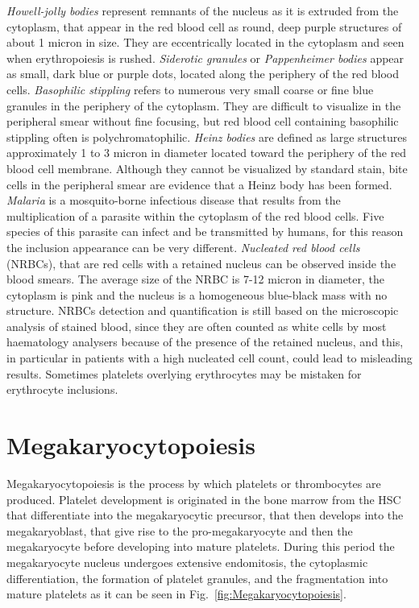 \documentclass[final,a4paper,12pt,english]{UnicaPhdThesis3}
\begin{document}
\textit{Howell-jolly bodies} represent remnants of the nucleus as it is extruded from the cytoplasm, that appear in the red blood cell as round, deep purple structures of about 1 micron in size. They are eccentrically located in the cytoplasm and seen when erythropoiesis is rushed. \textit{Siderotic granules} or \textit{Pappenheimer bodies} appear as small, dark blue or purple dots, located along the periphery of the red blood cells. \textit{Basophilic stippling} refers to numerous very small coarse or fine blue granules in the periphery of the cytoplasm. They are difficult to visualize in the peripheral smear without fine focusing, but red blood cell containing basophilic stippling often is polychromatophilic. \textit{Heinz bodies} are defined as large structures approximately 1 to 3 micron in diameter located toward the periphery of the red blood cell membrane. Although they cannot be visualized by standard stain, bite cells in the peripheral smear are evidence that a Heinz body has been formed. \textit{Malaria} is a mosquito-borne infectious disease that results from the multiplication of a parasite within the cytoplasm of the red blood cells. Five species of this parasite can infect and be transmitted by humans, for this reason the inclusion appearance can be very different. \textit{Nucleated red blood cells} (NRBCs), that are red cells with a retained nucleus can be observed inside the blood smears. The average size of the NRBC is 7-12 micron in diameter, the cytoplasm is pink and the nucleus is a homogeneous blue-black mass with no structure. NRBCs detection and quantification is still based on the microscopic analysis of stained blood, since they are often counted as white cells by most haematology analysers because of the presence of the retained nucleus, and this, in particular in patients with a high nucleated cell count, could lead to misleading results. Sometimes platelets overlying erythrocytes may be mistaken for erythrocyte inclusions. 

\section{Megakaryocytopoiesis}
Megakaryocytopoiesis is the process by which platelets or thrombocytes are produced. Platelet development is originated in the bone marrow from the HSC that differentiate into the megakaryocytic precursor, that then develops into the megakaryoblast, that give rise to the pro-megakaryocyte and then the megakaryocyte before developing into mature platelets. During this period the megakaryocyte nucleus undergoes extensive endomitosis, the cytoplasmic differentiation, the formation of platelet granules, and the fragmentation into mature platelets as it can be seen in Fig.~\ref{fig:Megakaryocytopoiesis}.
\end{document}
